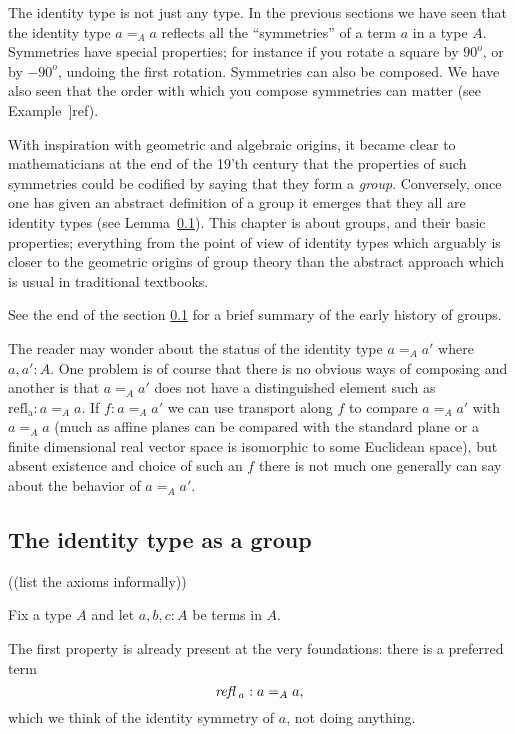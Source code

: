 \newcommand{\ie}{i.e.,\xspace}
The identity type is not just any type.  In the previous sections we have seen that the identity type $a=_Aa$ reflects all the ``symmetries'' of a term $a$ in a type $A$.  Symmetries have special properties; for instance if you rotate a square by $90^o$, or by $-90^o$, undoing the first rotation.  Symmetries can also be composed.  
We have also seen that the order with which you compose symmetries can matter (see Example~]ref{}).

With inspiration with geometric and algebraic origins, it became clear to mathematicians at the end of the 19'th century that the properties of such symmetries could be codified by saying that they form a {\em group}.  Conversely, once one has given an abstract definition of a group it emerges that they all are identity types (see Lemma~\ref{}).  This chapter is about groups, and their basic properties; everything from the point of view of identity types which arguably is closer to the geometric origins of group theory than the abstract approach which is usual in traditional textbooks.  

See the end of the section \ref{} for a brief summary of the early history of groups.  
\begin{remark}
  The reader may wonder about the status of the identity type $a=_Aa'$ where $a,a':A$.  One problem is of course that there is no obvious ways of composing and another is that $a=_Aa'$ does not have a distinguished element such as $\mathrm{refl{}_a}:a=_Aa$.
If $f:a=_Aa'$ we can use transport along $f$ to compare $a=_Aa'$ with $a=_Aa$ (much as affine planes can be compared with the standard plane or a finite dimensional real vector space is isomorphic to some Euclidean space), but absent existence and choice of such an $f$ there is not much one generally can say about the behavior of $a=_Aa'$.
\end{remark}

\subsection{The identity type as a group}

((list the axioms informally))

Fix a type $A$ and let $a,b,c:A$ be terms in $A$.

The first property is already present at the very foundations: there is a preferred term
$$\mathop{{\it refl}}{}_a:a=_Aa,$$
which we think of the identity symmetry of $a$, not doing anything.

